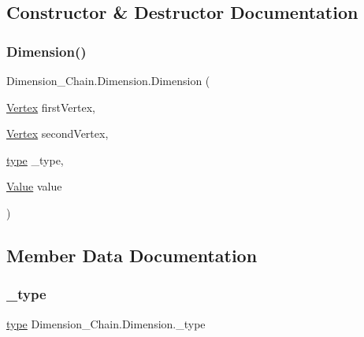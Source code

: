 \subsection{Constructor \& Destructor Documentation}
\mbox{\label{class_dimension___chain_1_1_dimension_a4d20f1328ddc226bcbdf693ab62782d2}} 
\subsubsection{\texorpdfstring{Dimension()}{Dimension()}}
{\footnotesize\ttfamily Dimension\+\_\+\+Chain.\+Dimension.\+Dimension (\begin{DoxyParamCaption}\item[{\mbox{\hyperlink{class_dimension___chain_1_1_vertex}{Vertex}}}]{first\+Vertex,  }\item[{\mbox{\hyperlink{class_dimension___chain_1_1_vertex}{Vertex}}}]{second\+Vertex,  }\item[{\mbox{\hyperlink{namespace_dimension___chain_a6ec9051138598c61cc00acf2547dced4}{type}}}]{\+\_\+type,  }\item[{\mbox{\hyperlink{class_dimension___chain_1_1_value}{Value}}}]{value }\end{DoxyParamCaption})}



\subsection{Member Data Documentation}
\mbox{\label{class_dimension___chain_1_1_dimension_ac18f5f8b3700a2ce95008310acf6213f}} 
\subsubsection{\texorpdfstring{\+\_\+type}{\_type}}
{\footnotesize\ttfamily \mbox{\hyperlink{namespace_dimension___chain_a6ec9051138598c61cc00acf2547dced4}{type}} Dimension\+\_\+\+Chain.\+Dimension.\+\_\+type}

